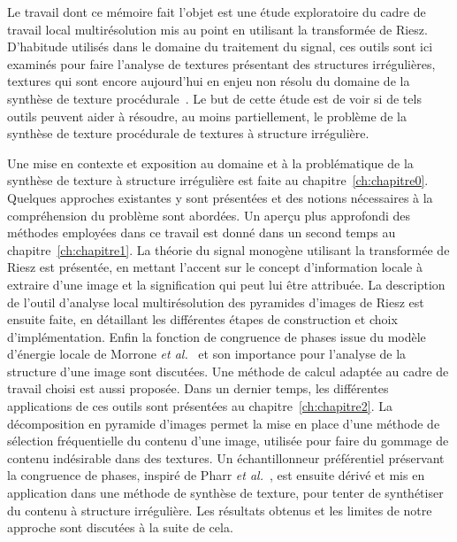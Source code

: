 \Conclusion 
\label{ch:conclusion}


Le travail dont ce mémoire fait l'objet est une étude exploratoire du cadre de travail local multirésolution mis au point en utilisant la transformée de Riesz. D'habitude utilisés dans le domaine du traitement du signal, ces outils sont ici examinés pour faire l'analyse de textures présentant des structures irrégulières, textures qui sont encore aujourd'hui en enjeu non résolu du domaine de la synthèse de texture procédurale~\cite{guehl_semi-procedural_2020}. Le but de cette étude est de voir si de tels outils peuvent aider à résoudre, au moins partiellement, le problème de la synthèse de texture procédurale de textures à structure irrégulière.

\bigskip

Une mise en contexte et exposition au domaine et à la problématique de la synthèse de texture à structure irrégulière est faite au chapitre~\ref{ch:chapitre0}. Quelques approches existantes y sont présentées et des notions nécessaires à la compréhension du problème sont abordées. Un aperçu plus approfondi des méthodes employées dans ce travail est donné dans un second temps au chapitre~\ref{ch:chapitre1}. La théorie du signal monogène utilisant la transformée de Riesz est présentée, en mettant l'accent sur le concept d'information locale à extraire d'une image et la signification qui peut lui être attribuée. La description de l'outil d'analyse local multirésolution des pyramides d'images de Riesz est ensuite faite, en détaillant les différentes étapes de construction et choix d'implémentation. Enfin la fonction de congruence de phases issue du modèle d'énergie locale de Morrone \textit{et al.}~\cite{morrone_feature_1987, morrone_mach_1986} et son importance pour l'analyse de la structure d'une image sont discutées. Une méthode de calcul adaptée au cadre de travail choisi est aussi proposée. Dans un dernier temps, les différentes applications de ces outils sont présentées au chapitre~\ref{ch:chapitre2}. La décomposition en pyramide d'images permet la mise en place d'une méthode de sélection fréquentielle du contenu d'une image, utilisée pour faire du gommage de contenu indésirable dans des textures. Un échantillonneur préférentiel préservant la congruence de phases, inspiré de Pharr \textit{et al.}~\cite{pharr_physically_2023}, est ensuite dérivé et mis en application dans une méthode de synthèse de texture, pour tenter de synthétiser du contenu à structure irrégulière. Les résultats obtenus et les limites de notre approche sont discutées à la suite de cela.

